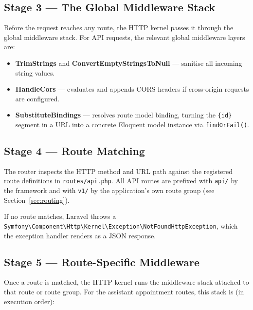 \subsection{Stage 3 --- The Global Middleware Stack}

Before the request reaches any route, the HTTP kernel passes it through
the global middleware stack. For API requests, the relevant global
middleware layers are:

\begin{itemize}
  \item \textbf{TrimStrings} and \textbf{ConvertEmptyStringsToNull} ---
    sanitise all incoming string values.
  \item \textbf{HandleCors} --- evaluates and appends CORS headers if
    cross-origin requests are configured.
  \item \textbf{SubstituteBindings} --- resolves route model binding,
    turning the \texttt{\{id\}} segment in a URL into a concrete Eloquent
    model instance via \texttt{findOrFail()}.
\end{itemize}

\subsection{Stage 4 --- Route Matching}

The router inspects the HTTP method and URL path against the registered
route definitions in \texttt{routes/api.php}. All API routes are prefixed
with \texttt{api/} by the framework and with \texttt{v1/} by the
application's own route group (see Section~\ref{sec:routing}).

If no route matches, Laravel throws a
\texttt{Symfony\textbackslash{}Component\textbackslash{}Http\textbackslash{}Kernel\textbackslash{}Exception\textbackslash{}NotFoundHttpException},
which the exception handler renders as a \stnotfound{} JSON response.

\subsection{Stage 5 --- Route-Specific Middleware}

Once a route is matched, the HTTP kernel runs the middleware stack
attached to that route or route group. For the assistant appointment
routes, this stack is (in execution order):

